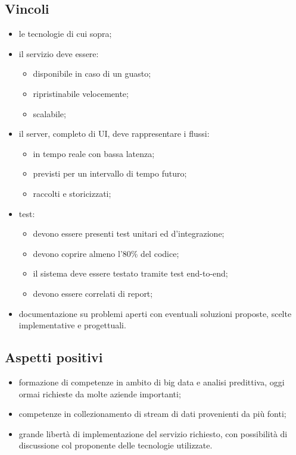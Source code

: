 \subsection{Vincoli}
\begin{itemize}
    \item le tecnologie di cui sopra;
    \item il servizio deve essere:
    \begin{itemize}
        \item disponibile in caso di un guasto;
        \item ripristinabile velocemente;
        \item scalabile;
    \end{itemize}
    \item il server, completo di UI, deve rappresentare i flussi:
    \begin{itemize}
        \item in tempo reale con bassa latenza;
        \item previsti per un intervallo di tempo futuro;
        \item raccolti e storicizzati;
    \end{itemize}
    \item test:
    \begin{itemize}
        \item devono essere presenti test unitari ed d'integrazione;
        \item devono coprire almeno l'80\% del codice;
        \item il sistema deve essere testato tramite test end-to-end;
        \item devono essere correlati di report;
    \end{itemize}
    \item documentazione su problemi aperti con eventuali soluzioni proposte, scelte implementative e progettuali.
\end{itemize}
\subsection{Aspetti positivi}
\begin{itemize}
    \item formazione di competenze in ambito di big data e analisi predittiva, oggi ormai richieste da molte aziende importanti;
    \item competenze in collezionamento di stream di dati provenienti da più fonti;
    \item grande libertà di implementazione del servizio richiesto, con possibilità di discussione col proponente delle tecnologie utilizzate.
\end{itemize}
